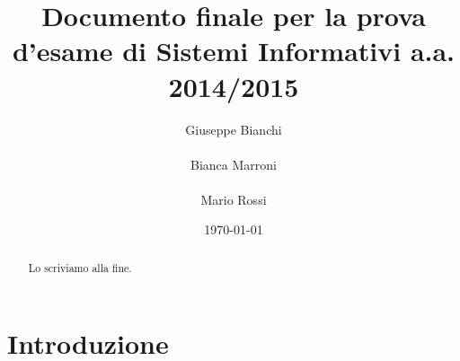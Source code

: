 \documentclass{llncs}
\begin{document}
\title{Documento finale per la prova d'esame di Sistemi Informativi
  a.a. 2014/2015} 
\author{
  Giuseppe Bianchi\\\\ 
  Bianca Marroni\\\\ 
  Mario Rossi\\} 
\institute{}

\date{\today}

\maketitle
\begin{abstract}
Lo scriviamo alla fine.
	
	
\end{abstract}

\section{Introduzione}
\label{sec:introduzione}
\end{document}
